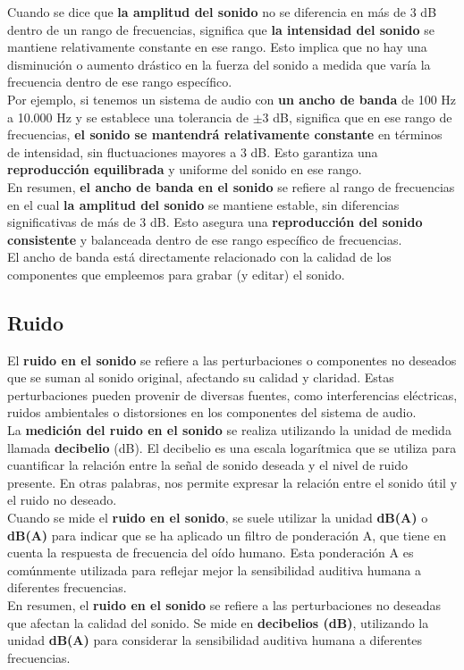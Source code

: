 \documentclass[
	12pt, %
	fleqn, %
	a4paper, %
	oneside, %
]{LegrandOrangeBook}
\begin{document}
Cuando se dice que \textbf{la amplitud del sonido} no se diferencia en más de 3 dB dentro de un rango de frecuencias, significa que \textbf{la intensidad del sonido} se mantiene relativamente constante en ese rango. Esto implica que no hay una disminución o aumento drástico en la fuerza del sonido a medida que varía la frecuencia dentro de ese rango específico.\\
Por ejemplo, si tenemos un sistema de audio con \textbf{un ancho de banda} de 100 Hz a 10.000 Hz y se establece una tolerancia de $\pm$3 dB, significa que en ese rango de frecuencias, \textbf{el sonido se mantendrá relativamente constante} en términos de intensidad, sin fluctuaciones mayores a 3 dB. Esto garantiza una \textbf{reproducción equilibrada} y uniforme del sonido en ese rango.\\
En resumen, \textbf{el ancho de banda en el sonido} se refiere al rango de frecuencias en el cual \textbf{la amplitud del sonido} se mantiene estable, sin diferencias significativas de más de 3 dB. Esto asegura una \textbf{reproducción del sonido consistente} y balanceada dentro de ese rango específico de frecuencias.\\
El ancho de banda está directamente relacionado con la calidad de los componentes que empleemos para grabar (y editar) el sonido. 
\subsection{Ruido}
El \textbf{ruido en el sonido} se refiere a las perturbaciones o componentes no deseados que se suman al sonido original, afectando su calidad y claridad. Estas perturbaciones pueden provenir de diversas fuentes, como interferencias eléctricas, ruidos ambientales o distorsiones en los componentes del sistema de audio.\\
La \textbf{medición del ruido en el sonido} se realiza utilizando la unidad de medida llamada \textbf{decibelio} (dB). El decibelio es una escala logarítmica que se utiliza para cuantificar la relación entre la señal de sonido deseada y el nivel de ruido presente. En otras palabras, nos permite expresar la relación entre el sonido útil y el ruido no deseado.\\
Cuando se mide el \textbf{ruido en el sonido}, se suele utilizar la unidad \textbf{dB(A)} o \textbf{dB(A)} para indicar que se ha aplicado un filtro de ponderación A, que tiene en cuenta la respuesta de frecuencia del oído humano. Esta ponderación A es comúnmente utilizada para reflejar mejor la sensibilidad auditiva humana a diferentes frecuencias.\\
En resumen, el \textbf{ruido en el sonido} se refiere a las perturbaciones no deseadas que afectan la calidad del sonido. Se mide en \textbf{decibelios (dB)}, utilizando la unidad \textbf{dB(A)} para considerar la sensibilidad auditiva humana a diferentes frecuencias.
\end{document}
